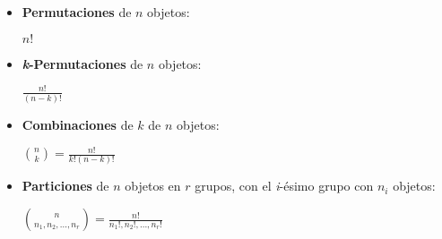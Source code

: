 \begin{tcolorbox}[colback=blue!5!white,colframe=blue!60!black,title=Resumen: Técnicas de conteo]

	\begin{itemize}
		\item \textbf{Permutaciones} de $n$ objetos:
		\begin{center}
		$n!$
		\end{center}

		\item \textbf{\textit{k}-Permutaciones} de $n$ objetos:
		\begin{center}
		$\frac{n!}{(n-k)!}$
		\end{center}

		\item \textbf{Combinaciones} de $k$ de $n$ objetos:
		\begin{center}
		$\binom{n}{k} = \frac{n!}{k!(n-k)!}$
		\end{center}

		\item \textbf{Particiones} de $n$ objetos en $r$ grupos, con el \textit{i}-ésimo
		grupo con $n_i$ objetos:
		\begin{center}
			$\binom{n}{n_1,n_2,...,n_r} = \frac{n!}{n_1!,n_2!,...,n_r!}$
		\end{center}

	\end{itemize}
	
\end{tcolorbox}
